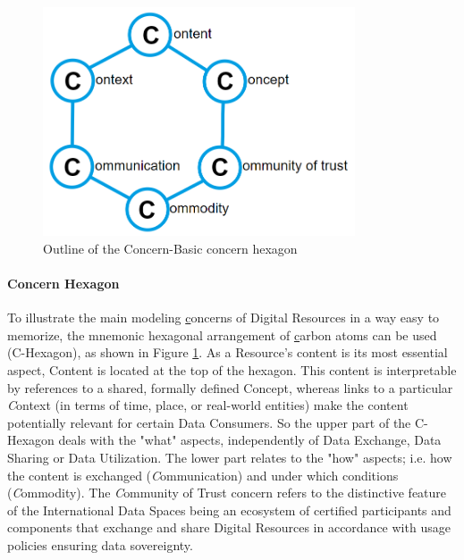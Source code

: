 
\begin{figure}[h]
	\begin{Center}
		\includegraphics[width=3.64in,height=2.67in]{./media/image32.png}
		\caption{Outline of the Concern-Basic concern hexagon}
		\label{fig:Outline_of_the_ConcernBasic_concern_hexagon}
	\end{Center}
\end{figure}



\paragraph{Concern Hexagon\\}
To illustrate the main modeling \uline{c}oncerns of Digital Resources in a way easy to memorize, the mnemonic hexagonal arrangement of \uline{c}arbon atoms can be used (C-Hexagon), as shown in Figure \ref{fig:Outline_of_the_ConcernBasic_concern_hexagon}. As a Resource’s content is its most essential aspect, Content is located at the top of the hexagon. This content is interpretable by references to a shared, formally defined Concept, whereas links to a particular \textit{C}ontext\textit{ }(in terms of time, place, or real-world entities) make the content potentially relevant for certain Data Consumers. So the upper part of the C-Hexagon deals with the "what" aspects, independently of Data Exchange, Data Sharing or Data Utilization. The lower part relates to the "how" aspects; i.e. how the content is exchanged (\textit{C}ommunication) and under which conditions (\textit{C}ommodity). The \textit{C}ommunity of Trust concern refers to the distinctive feature of the International Data Spaces being an ecosystem of certified participants and components that exchange and share Digital Resources in accordance with usage policies ensuring data sovereignty.

